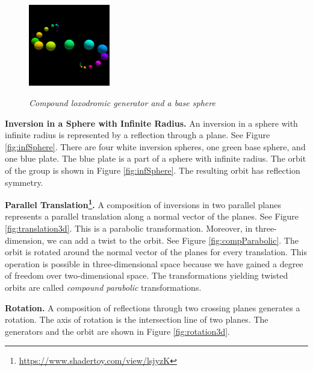 \begin{figure}[h!tbp]
\begin{minipage}[t]{0.5\hsize}
 \hspace*{\fill}
  \begin{minipage}[t]{0.25\hsize}
   \center
   \includegraphics[width=1.4in, height=1.4in, keepaspectratio]{./img/application/3dGen/compLoxoOneOrb.pdf}
   \label{fig:compLoxoOrb}
  \end{minipage}
  \hspace*{\fill}
  \caption{\textit{Compound loxodromic generator and a base sphere}}
  \label{fig:compLoxo}
 \end{minipage}
\end{figure}

\noindent\textbf{Inversion in a Sphere with Infinite Radius.}
An inversion in a sphere with infinite radius is represented by
a reflection through a plane.
See Figure \ref{fig:infSphere}.
There are four white inversion spheres, one green base sphere,
and one blue plate.
The blue plate is a part of a sphere with infinite radius.
The orbit of the group is shown in Figure
\ref{fig:infSphere}.
The resulting orbit has reflection symmetry.

\noindent\textbf{Parallel
Translation\footnote{\url{https://www.shadertoy.com/view/lsjyzK}}.}
A composition of inversions in two parallel planes represents a parallel
translation along a normal vector of the planes.
See Figure \ref{fig:translation3d}.
This is a parabolic transformation.
Moreover, in three-dimension, we can add a twist to the orbit.
See Figure \ref{fig:compParabolic}.
The orbit is rotated around the normal vector of the planes for every
translation.
This operation is possible in three-dimensional space because we have gained a degree
of freedom over two-dimensional space.
The transformations yielding twisted orbits are called \textit{compound
parabolic} transformations.

\noindent\textbf{Rotation.}
A composition of reflections through two crossing planes generates a rotation.
The axis of rotation is the intersection line of two planes.
The generators and the orbit are shown in Figure \ref{fig:rotation3d}.

